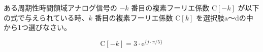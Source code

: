 ある周期性時間領域アナログ信号の $-k$ 番目の複素フーリエ係数 $\textrm{C}[-k]$ が以下の式で与えられている時、$k$ 番目の複素フーリエ係数 $\textrm{C}[k]$ を選択肢a〜dの中から1つ選びなさい。

\[
\textrm{C}[-k] = 3 \cdot \textrm{e}^{\{ j \cdot \pi/5 \}}
\]
